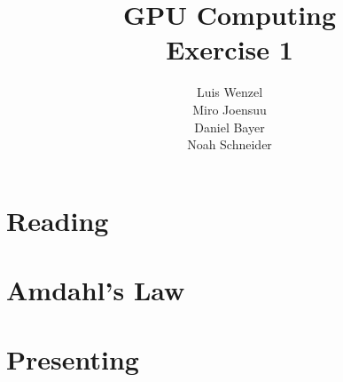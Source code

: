 \documentclass[12pt,twoside,a4paper]{article}
\title{GPU Computing\\
Exercise 1}
\author{
  Luis Wenzel\\
  Miro Joensuu\\
  Daniel Bayer\\
  Noah Schneider
}
\date{}
\begin{document}
\maketitle
\section{Reading}



\section{Amdahl's Law}


	

\section{Presenting}

\end{document}
